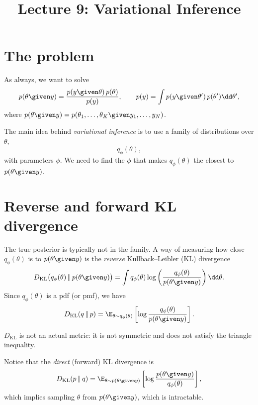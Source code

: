 
\title{Lecture 9: Variational Inference}
\author{}\date{}


\maketitle

\section{The problem}
As always, we want to solve
\[
p(\theta \given y) = \frac{p(y \given \theta)\,p(\theta)}{p(y)},
\qquad
p(y) = \int p(y \given \theta')\,p(\theta')\dd\theta',
\]
where $p(\theta \given y) = p(\theta_1, \dots, \theta_K \given y_1, \dots, y_N)$.

The main idea behind \emph{variational inference} is to use a family of distributions over $\theta$,
\[
q_\phi(\theta),
\]
with parameters $\phi$. We need to find the $\phi$ that makes $q_\phi(\theta)$ the closest to $p(\theta \given y)$.

\section{Reverse and forward KL divergence}
The true posterior is typically not in the family. A way of measuring how close $q_\phi(\theta)$ is to $p(\theta \given y)$ is the \emph{reverse} Kullback--Leibler (KL) divergence
\[
D_{\mathrm{KL}}\bigl(q_\phi(\theta) \,\|\, p(\theta \given y)\bigr) = \int q_\phi(\theta)\log\left(\frac{q_\phi(\theta)}{p(\theta \given y)}\right)\dd\theta.
\]
Since $q_\phi(\theta)$ is a pdf (or pmf), we have
\[
D_{\mathrm{KL}}(q \,\|\, p) = \E_{\theta \sim q_\phi(\theta)}\left[\log\frac{q_\phi(\theta)}{p(\theta \given y)}\right].
\]

\begin{remark}
$D_{\mathrm{KL}}$ is not an actual metric: it is not symmetric and does not satisfy the triangle inequality.
\end{remark}

Notice that the \emph{direct} (forward) KL divergence is
\[
D_{\mathrm{KL}}(p \,\|\, q) = \E_{\theta \sim p(\theta \given y)}\left[\log\frac{p(\theta \given y)}{q_\phi(\theta)}\right],
\]
which implies sampling $\theta$ from $p(\theta \given y)$, which is intractable.

